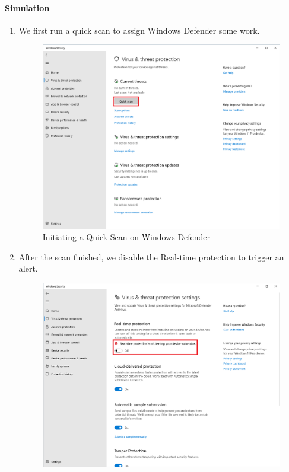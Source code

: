 \paragraph{Simulation}
\begin{enumerate}
    \item We first run a quick scan to assign Windows Defender some work.
    \begin{figure}[H]
        \centering
        \includegraphics[width=\textwidth]{images/malware-detection/windows-log/2.png}
        \caption{Initiating a Quick Scan on Windows Defender}
        \label{fig:win-quick-scan}
    \end{figure}
    \item After the scan finished, we disable the Real-time protection to trigger an alert.
    \begin{figure}[H]
        \centering
        \includegraphics[width=\textwidth]{images/malware-detection/windows-log/3.png}

\end{figure}
\end{enumerate}
